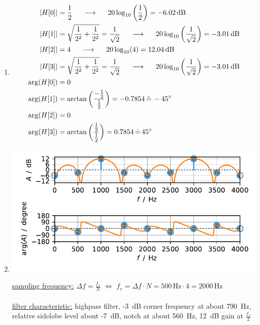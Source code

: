\documentclass[11pt,a4paper,DIV=12]{scrartcl}
\begin{document}
\begin{Loesung}
\begin{enumerate}[label=\alph*)]
	\item \begin{align}
	|H[0]|&=\frac{1}{2} \hspace{5mm}\longrightarrow\hspace{5mm} 20\log_{10}\left(\frac{1}{2}\right)=-6.02\,\text{dB}\nonumber\\
	|H[1]|&=\sqrt{\frac{1}{2^2}+\frac{1}{2^2}}=\frac{1}{\sqrt{2}} \hspace{5mm}\longrightarrow\hspace{5mm} 20\log_{10}\left(\frac{1}{\sqrt{2}}\right)=-3.01\,\text{dB}\nonumber\\
	|H[2]|&=4 \hspace{5mm}\longrightarrow\hspace{5mm} 20\log_{10}(4)=12.04\,\text{dB}\nonumber\\
	|H[3]|&=\sqrt{\frac{1}{2^2}+\frac{1}{2^2}}=\frac{1}{\sqrt{2}} \hspace{5mm}\longrightarrow\hspace{5mm} 20\log_{10}\left(\frac{1}{\sqrt{2}}\right)=-3.01\,\text{dB}\nonumber\\
	\arg(H[0])&=0\nonumber\\
	\arg(H[1])&=\arctan\left(\frac{-\frac{1}{2}}{\frac{1}{2}}\right)=-0.7854\,\hat{=}\,-45^{\circ}\nonumber\\
	\arg(H[2])&=0\nonumber\\
	\arg(H[3])&=\arctan\left(\frac{\frac{1}{2}}{\frac{1}{2}}\right)=0.7854\,\hat{=}\,45^{\circ}\nonumber
	\end{align}
	\item \text{}
	\begin{center}%
		\includegraphics[width=5in, height=2.5in]{graphics/UE1_Exercise4_Spectrum.pdf}%
	\end{center}%
	\underline{sampling frequency:} $\Delta f=\frac{f_s}{N}\,\,\Leftrightarrow\,\,f_s=\Delta f\cdot N=500\,\text{Hz}\cdot4=2000\,\text{Hz}$\\\\
	\underline{filter characteristic:} highpass filter, -3~dB corner frequency at
	about 790~Hz, relative sidelobe level about -7~dB, notch at about 560~Hz,
	12~dB gain at $\frac{f_s}{2}$
\end{enumerate}
\end{Loesung}
\end{document}
